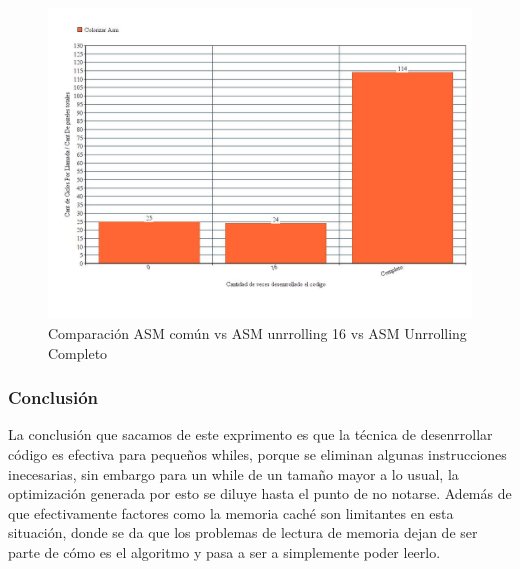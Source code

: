 \begin{figure}[H]
\centering
\captionsetup{justification=centering}
	\includegraphics[width = 15 cm, height = 8 cm]{imagenes/unroll.jpg}
	\caption[center]{Comparación ASM común vs ASM unrrolling 16 vs ASM Unrrolling Completo}
\end{figure}
\medskip
	
\subsubsection{Conclusión}
\par{La conclusión que sacamos de este exprimento es que la técnica de desenrrollar código es efectiva para pequeños whiles, porque se eliminan algunas instrucciones inecesarias, sin embargo para un while de un tamaño mayor a lo usual, la optimización generada por esto se diluye hasta el punto de no notarse. Además de que efectivamente factores como la memoria caché son limitantes en esta situación, donde se da que los problemas de lectura de memoria dejan de ser parte de cómo es el algoritmo y pasa a ser a simplemente poder leerlo.}